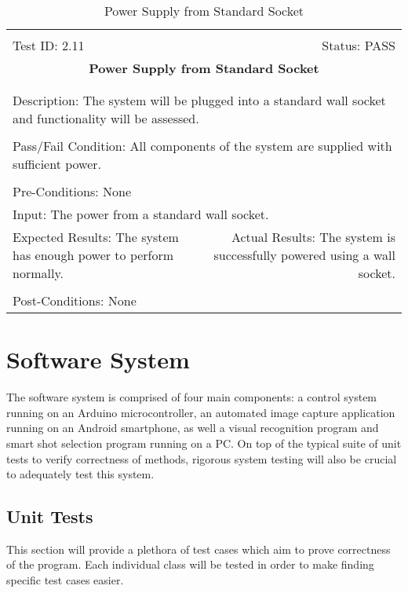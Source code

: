 \documentclass[titlepage]{article}
\begin{document}
\begin{center}
\begin{table}[h!]
\begin{tabular}{|l r|}\hline&\\[-2mm]
	Test ID: 2.11	&Status: PASS\\[-3mm]
	\multicolumn{2}{|c|}{\textbf{\large{Power Supply from Standard Socket}}}\\&\\\hline&\\[-3mm]
	\multicolumn{2}{|p{\textwidth}|}{Description: The system will be plugged into a standard wall socket and functionality will be assessed.}\\[1mm]\hline&\\[-3mm]
	\multicolumn{2}{|p{\textwidth}|}{Pass/Fail Condition: All components of the system are supplied with sufficient power.}\\[1mm]\hline&\\[-3mm]
	\multicolumn{2}{|p{\textwidth}|}{Pre-Conditions: None}\\[4mm]
	\multicolumn{2}{|p{\textwidth}|}{Input: The power from a standard wall socket.}\\[2mm]\hline
	\multicolumn{1}{|p{0.49\textwidth}}{Expected Results: The system has enough power to perform normally.}	&\multicolumn{1}{|p{0.45\textwidth}|}{Actual Results: The system is successfully powered using a wall socket.}\\\hline&\\[-3mm]
	\multicolumn{2}{|p{\textwidth}|}{Post-Conditions: None}\\\hline
\end{tabular}
\caption{Power Supply from Standard Socket}
\end{table}
\end{center}


\section{Software System}
The software system is comprised of four main components: a control system running on an Arduino microcontroller, an automated image capture application running on an Android smartphone, as well a visual recognition program and smart shot selection program running on a PC. On top of the typical suite of unit tests to verify correctness of methods, rigorous system testing will also be crucial to adequately test this system.

\subsection{Unit Tests}
This section will provide a plethora of test cases which aim to prove correctness of the program. Each individual class will be tested in order to make finding specific test cases easier.
\end{document}

